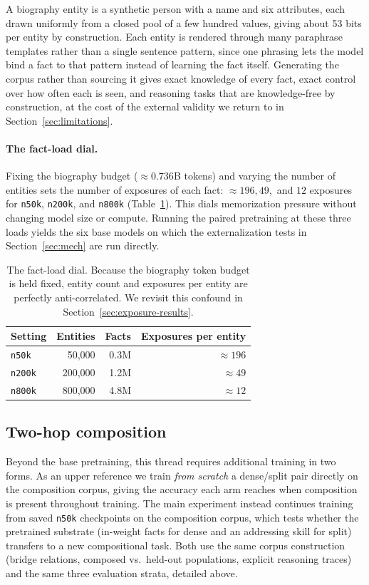 \documentclass{article}
\begin{document}
A biography entity is a synthetic person with a name and six attributes, each drawn uniformly from a closed pool of a few hundred values, giving about 53 bits per entity by construction. Each entity is rendered through many paraphrase templates rather than a single sentence pattern, since one phrasing lets the model bind a fact to that pattern instead of learning the fact itself. Generating the corpus rather than sourcing it gives exact knowledge of every fact, exact control over how often each is seen, and reasoning tasks that are knowledge-free by construction, at the cost of the external validity we return to in Section~\ref{sec:limitations}.

\paragraph{The fact-load dial.} Fixing the biography budget ($\approx 0.736$B tokens) and varying the number of entities sets the number of exposures of each fact: $\approx 196, 49,$ and $12$ exposures for \texttt{n50k}, \texttt{n200k}, and \texttt{n800k} (Table~\ref{tab:dial}). This dials memorization pressure without changing model size or compute. Running the paired pretraining at these three loads yields the six base models on which the externalization tests in Section~\ref{sec:mech} are run directly.

\begin{table}[!htbp]
\centering
\caption{The fact-load dial. Because the biography token budget is held fixed, entity count and exposures per entity are perfectly anti-correlated. We revisit this confound in Section~\ref{sec:exposure-results}.}
\label{tab:dial}
\begin{tabular}{lrrr}
\toprule Setting & Entities & Facts & Exposures per entity \\
\midrule
\texttt{n50k}  & 50{,}000  & 0.3M & $\approx 196$ \\
\texttt{n200k} & 200{,}000 & 1.2M & $\approx 49$ \\
\texttt{n800k} & 800{,}000 & 4.8M & $\approx 12$ \\
\bottomrule
\end{tabular}
\end{table}

\subsection{Two-hop composition}
\label{sec:twohop-method}
Beyond the base pretraining, this thread requires additional training in two forms. As an upper reference we train \emph{from scratch} a dense/split pair directly on the composition corpus, giving the accuracy each arm reaches when composition is present throughout training. The main experiment instead continues training from saved \texttt{n50k} checkpoints on the composition corpus, which tests whether the pretrained substrate (in-weight facts for dense and an addressing skill for split) transfers to a new compositional task. Both use the same corpus construction (bridge relations, composed vs.\ held-out populations, explicit reasoning traces) and the same three evaluation strata, detailed above.
\end{document}
